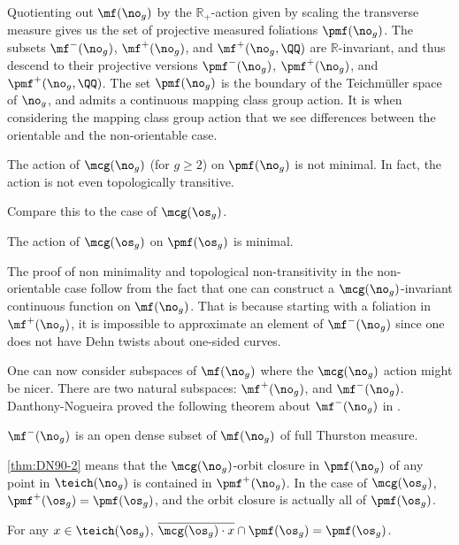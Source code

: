 \documentclass[12pt, reqno]{amsart}
\begin{document}
Quotienting out $\mf(\no_g)$ by the $\mathbb{R_+}$-action given by scaling the transverse measure gives us the set of projective measured foliations $\pmf(\no_g)$.
The subsets $\mf^-(\no_g)$, $\mf^+(\no_g)$, and $\mf^+(\no_g, \QQ)$ are $\mathbb{R}$-invariant, and thus descend to their projective versions $\pmf^-(\no_g)$, $\pmf^+(\no_g)$, and $\pmf^+(\no_g, \QQ)$.
The set $\pmf(\no_g)$ is the boundary of the Teichm\"uller space of $\no_g$, and admits a continuous mapping class group action.
It is when considering the mapping class group action that we see differences between the orientable and the non-orientable case.

\begin{theorem}
  \label{thm:full-non-minimal}
  The action of $\mcg(\no_g)$ (for $g \geq 2$) on $\pmf(\no_g)$ is not minimal.
  In fact, the action is not even topologically transitive.
\end{theorem}

Compare this to the case of $\mcg(\os_g)$.
\begin{theorem}
  \label{thm:orientable-orbit-closure}
  The action of $\mcg(\os_g)$ on $\pmf(\os_g)$ is minimal.
\end{theorem}

\begin{remark}
  The proof of non minimality and topological non-transitivity in the non-orientable case follow from the fact that one can construct a $\mcg(\no_g)$-invariant continuous function on $\mf(\no_g)$.
  That is because starting with a foliation in $\mf^+(\no_g)$, it is impossible to approximate an element of $\mf^-(\no_g)$ since one does not have Dehn twists about one-sided curves.
\end{remark}

One can now consider subspaces of $\mf(\no_g)$ where the $\mcg(\no_g)$ action might be nicer. There are two natural subspaces: $\mf^+(\no_g)$, and $\mf^{-}(\no_g)$.
Danthony-Nogueira proved the following theorem about $\mf^{-}(\no_g)$ in \cite{ASENS_1990_4_23_3_469_0}.

\begin{theorem}
  \label{thm:DN90-2}
  $\mf^{-}(\no_g)$ is an open dense subset of $\mf(\no_g)$ of full Thurston measure.
\end{theorem}

\autoref{thm:DN90-2} means that the $\mcg(\no_g)$-orbit closure in $\pmf(\no_g)$ of any point in $\teich(\no_g)$ is contained in $\pmf^+(\no_g)$.
In the case of $\mcg(\os_g)$, $\pmf^+(\os_g) = \pmf(\os_g)$, and the orbit closure is actually all of $\pmf(\os_g)$.
\begin{corollary}
  For any $x \in \teich(\os_g)$, $\overline{\mcg(\os_g) \cdot x} \cap \pmf(\os_g) = \pmf(\os_g)$.
\end{corollary}
\end{document}
